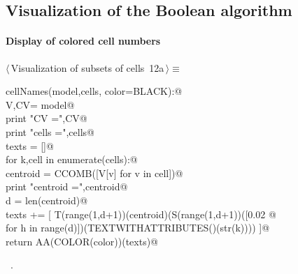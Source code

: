 \documentclass[11pt,oneside]{article}	%
\begin{document}
\subsection{Visualization of the Boolean algorithm}

\paragraph{Display of colored cell numbers}

\begin{flushleft} \small \label{scrap17}
\protect{}$\langle\,$Visualization of subsets of cells\nobreak\ {\footnotesize 12a}$\,\rangle\equiv$
\vspace{-1ex}
\begin{list}{}{} \item
\mbox{}\verb@def cellNames(model,cells, color=BLACK):@\\
\mbox{}\verb@   V,CV= model@\\
\mbox{}\verb@   print "\n CV =",CV@\\
\mbox{}\verb@   print "\n cells =",cells@\\
\mbox{}\verb@   texts = []@\\
\mbox{}\verb@   for k,cell in enumerate(cells):@\\
\mbox{}\verb@      centroid = CCOMB([V[v] for v in cell])@\\
\mbox{}\verb@      print "centroid =",centroid@\\
\mbox{}\verb@      d = len(centroid)@\\
\mbox{}\verb@      texts += [ T(range(1,d+1))(centroid)(S(range(1,d+1))([0.02 @\\
\mbox{}\verb@                  for h in range(d)])(TEXTWITHATTRIBUTES()(str(k)))) ]@\\
\mbox{}\verb@   return AA(COLOR(color))(texts)@\\
\mbox{}\verb@@{\NWsep}
\end{list}
\vspace{-1ex}
\footnotesize\addtolength{\baselineskip}{-1ex}
\begin{list}{}{\setlength{\itemsep}{-\parsep}\setlength{\itemindent}{-\leftmargin}}
\item \NWtxtMacroRefIn\ .
\end{list}
\end{flushleft}
\end{document}
